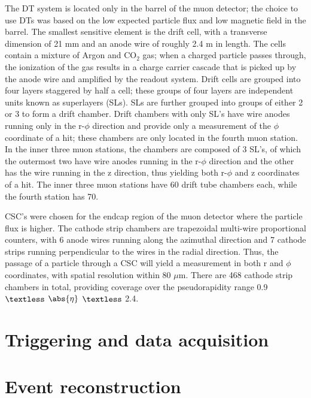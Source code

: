 The DT system is located only in the barrel of the muon detector; the choice to use DTs was based on the low expected particle flux and low magnetic field in the barrel. The smallest sensitive element is the drift cell, with a transverse dimension of 21 mm and an anode wire of roughly 2.4 m in length. The cells contain a mixture of Argon and CO$_2$ gas; when a charged particle passes through, the ionization of the gas results in a charge carrier cascade that is picked up by the anode wire and amplified by the readout system. Drift cells are grouped into four layers staggered by half a cell; these groups of four layers are independent units known as superlayers (SLs). SLs are further grouped into groups of either 2 or 3 to form a drift chamber. Drift chambers with only SL's have wire anodes running only in the r-$\phi$ direction and provide only a measurement of the $\phi$ coordinate of a hit; these chambers are only located in the fourth muon station. In the inner three muon stations, the chambers are composed of 3 SL's, of which the outermost two have wire anodes running in the r-$\phi$ direction and the other has the wire running in the z direction, thus yielding both r-$\phi$ and z coordinates of a hit. The inner three muon stations have 60 drift tube chambers each, while the fourth station has 70.

CSC's were chosen for the endcap region of the muon detector where the particle flux is higher. The cathode strip chambers are trapezoidal multi-wire proportional counters, with 6 anode wires running along the azimuthal direction and 7 cathode strips running perpendicular to the wires in the radial direction. Thus, the passage of a particle through a CSC will yield a measurement in both r and $\phi$ coordinates, with spatial resolution within 80 $\mu$m. There are 468 cathode strip chambers in total, providing coverage over the pseudorapidity range 0.9 $\textless$ $\abs{\eta}$ $\textless$ 2.4.

\section{Triggering and data acquisition\label{sec:cms-triggerdaq}}

\section{Event reconstruction\label{sec:cms-reco}}
